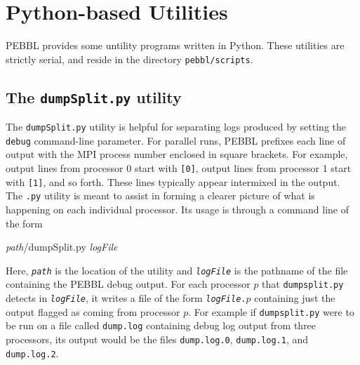 \section{Python-based Utilities}
\label{sec:pythonutils}
PEBBL provides some untility programs written in
Python.  These utilities are strictly serial, and reside in the
directory \texttt{pebbl/scripts}.


\subsection{The \texttt{dumpSplit.py} utility}
\label{sec:dumpsplit}
The \texttt{dumpSplit.py} utility is helpful for separating logs produced
by setting the \texttt{debug} command-line parameter.  For parallel
runs, PEBBL prefixes each line of output with the MPI process number
enclosed in square brackets.  For example, output lines from processor
0 start with \texttt{[0]}, output lines from processor 1 start with
\texttt{[1]}, and so forth.  These lines typically appear intermixed
in the output.  The \texttt{.py} utility is meant to assist in
forming a clearer picture of what is happening on each individual
processor.  Its usage is through a command line of the form
\begin{codeblock}
\textit{path}/dumpSplit.py \textit{logFile}
\end{codeblock}
Here, \texttt{\textit{path}} is the location of the utility
and \texttt{\textit{logFile}} is
the pathname of the file containing the PEBBL debug output.  For each
processor $p$ that \texttt{dumpsplit.py} detects in
\texttt{\textit{logFile}}, it writes a file of the form
\texttt{\textit{logFile}.$p$} containing just the output flagged as
coming from processor $p$.  For example if \texttt{dumpsplit.py} were to
be run on a file called \texttt{dump.log} containing debug log output
from three processors, its output would be the files
\texttt{dump.log.0}, \texttt{dump.log.1}, and \texttt{dump.log.2}.


